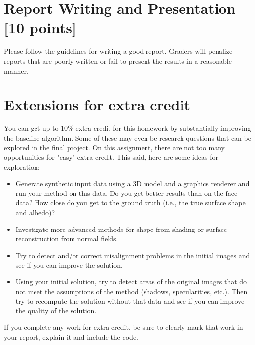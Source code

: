 \documentclass[10pt,letterpaper]{article}
\begin{document}
\section{Report Writing and Presentation [10 points]}

Please follow the guidelines for writing a good report.
Graders will penalize reports that are poorly written or fail to present the results in a reasonable manner.


\section{Extensions for extra credit}
You can get up to 10\% extra credit for this homework by substantially improving the baseline algorithm. Some of these may even be research questions that can be explored in the final project. 
On this assignment, there are not too many opportunities for "easy" extra credit. This said, here are some ideas for exploration:
\begin{itemize}
\item Generate synthetic input data using a 3D model and a graphics renderer and run your method on this data. Do you get better results than on the face data? How close do you get to the ground truth (i.e., the true surface shape and albedo)?
\item Investigate more advanced methods for shape from shading or surface reconstruction from normal fields.
\item Try to detect and/or correct misalignment problems in the initial images and see if you can improve the solution.
\item Using your initial solution, try to detect areas of the original images that do not meet the assumptions of the method (shadows, specularities, etc.). Then try to recompute the solution without that data and see if you can improve the quality of the solution.
\end{itemize}
If you complete any work for extra credit, be sure to clearly mark that work in your report, explain it and include the code.
\end{document}
